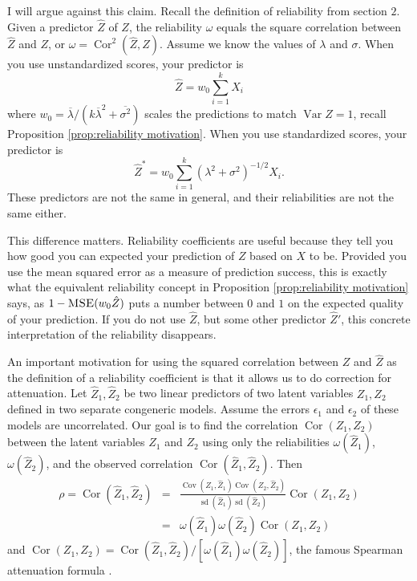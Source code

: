 \documentclass[twoside]{article}
\DeclareMathOperator{\Var}{Var}
\DeclareMathOperator{\sd}{sd}
\DeclareMathOperator{\Cor}{Cor}
\DeclareMathOperator{\Cov}{Cov}
\DeclareMathOperator{\MSE}{\textsc{MSE}}
\begin{document}
I will argue against this claim. Recall the definition of reliability from
section $2$. Given a predictor $\hat{Z}$ of $Z$, the
reliability $\omega$ equals the square correlation between $\hat{Z}$
and $Z$, or $\omega=\Cor^{2}(\hat{Z},Z)$. Assume
we know the values of $\lambda$ and $\sigma$. When you use unstandardized
scores, your predictor is $$\hat{Z}=w_{0}\sum_{i=1}^{k}X_{i}$$
where $w_{0}=\overline{\lambda}/(k\overline{\lambda}^{2}+\overline{\sigma^{2}})$ scales the predictions to match $\Var Z=1$, recall Proposition \ref{prop:reliability motivation}. When you use standardized
scores, your predictor is $$
\hat{Z}^{*}=w_{0}\sum_{i=1}^{k}(\lambda^{2}+\sigma^{2})^{-1/2}X_{i}.$$
These predictors are not the same in general, and their reliabilities are not
the same either.

This difference matters. Reliability coefficients are useful because they tell you how good you can expected your prediction of $Z$ based on $X$ to be. Provided you use the mean squared error as a measure of prediction success, this is exactly what the equivalent reliability concept in Proposition \ref{prop:reliability motivation} says, as $1 - \MSE(w_0\hat{Z})$ puts a number between $0$ and $1$ on the expected quality of your prediction. If you do not use $\hat{Z}$, but some other predictor $\hat{Z}'$, this concrete interpretation of the reliability disappears. 

An important motivation for using the squared
correlation between $Z$ and $\hat{Z}$ as the definition of a
reliability coefficient is that it allows us to do correction for
attenuation. Let $\hat{Z}_{1},\hat{Z}_{2}$ be two linear
predictors of two latent variables $Z_{1},Z_{2}$ defined in two separate
congeneric models. Assume the errors $\epsilon_{1}$ and $\epsilon_{2}$ of these models
are uncorrelated. Our goal is to find the correlation $\Cor(Z_{1},Z_{2})$
between the latent variables $Z_{1}$ and $Z_{2}$ using only the
reliabilities $\omega(\hat{Z}_{1})$, $\omega(\hat{Z}_{2})$,
and the observed correlation $\Cor(\hat{Z}_{1},\hat{Z}_{2})$.
Then
\begin{eqnarray*}
\rho=\Cor(\hat{Z}_{1},\hat{Z}_{2}) & = & \frac{\Cov(Z_{1},\hat{Z}_{1})\Cov(Z_{2},\hat{Z}_{2})}{\sd(\hat{Z}_{1})\sd(\hat{Z}_{2})}\Cor(Z_{1},Z_{2})\\
 & = & \omega(\hat{Z}_{1})\omega(\hat{Z}_{2})\Cor(Z_{1},Z_{2})
\end{eqnarray*}
and $\Cor(Z_{1},Z_{2})=\Cor(\hat{Z}_{1},\hat{Z}_{2})/[\omega(\hat{Z}_{1})\omega(\hat{Z}_{2})]$,
the famous Spearman attenuation formula \citep{spearman1904proof}.
\end{document}
